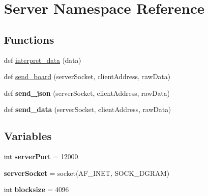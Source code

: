 \hypertarget{namespace_server}{}\section{Server Namespace Reference}
\label{namespace_server}
\subsection*{Functions}
\begin{DoxyCompactItemize}
\item 
def \hyperlink{namespace_server_ad1a623c39628e6a85484ed43248ecd8d}{interpret\+\_\+data} (data)
\item 
def \hyperlink{namespace_server_afb89b67e4b9b4c3fe2915449f2a450f6}{send\+\_\+board} (server\+Socket, client\+Address, raw\+Data)
\item 
\mbox{\label{namespace_server_a7080c6378acbbd9210c0e277a9ff730c}} 
def {\bfseries send\+\_\+json} (server\+Socket, client\+Address, raw\+Data)
\item 
\mbox{\label{namespace_server_a46433613af0b25ee488da2db17f095c7}} 
def {\bfseries send\+\_\+data} (server\+Socket, client\+Address, raw\+Data)
\end{DoxyCompactItemize}
\subsection*{Variables}
\begin{DoxyCompactItemize}
\item 
\mbox{\label{namespace_server_a61bdcf9181bf23a9f75d4b21bf33f614}} 
int {\bfseries server\+Port} = 12000
\item 
\mbox{\label{namespace_server_add1bf14e8e27f2efbb9dcd74c5344f1b}} 
{\bfseries server\+Socket} = socket(A\+F\+\_\+\+I\+N\+ET, S\+O\+C\+K\+\_\+\+D\+G\+R\+AM)
\item 
\mbox{\label{namespace_server_a457c766fba7cf0d2ce805c202d2daeed}} 
int {\bfseries blocksize} = 4096
\end{DoxyCompactItemize}



